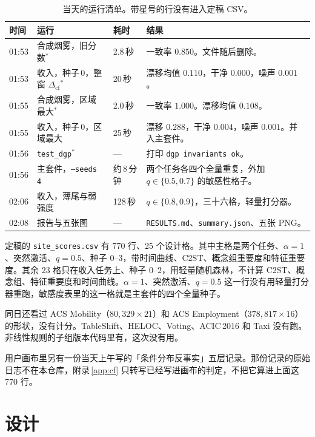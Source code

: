 \documentclass[11pt,a4paper,fontset=none]{ctexart}
\newcommand{\Dcf}{\ensuremath{\Delta_{\mathrm{cf}}}}
\begin{document}
\begin{table}[ht]
\centering
\caption{当天的运行清单。带星号的行没有进入定稿 CSV。}
\label{tab:runs}
\small
\begin{tabular}{@{}lll>{\raggedright\arraybackslash}p{6.5cm}@{}}
\toprule
时间 & 运行 & 耗时 & 结果 \\
\midrule
01:53 & 合成烟雾，旧分数\(^{*}\) & 2.8\,秒 & 一致率 \(0.850\)。文件随后删除。 \\
01:53 & 收入，种子\,0，整窗 \(\Dcf\)\(^{*}\) & 20\,秒 & 漂移均值 \(0.110\)，干净 \(0.000\)，噪声 \(0.001\)。 \\
01:55 & 合成烟雾，区域最大\(^{*}\) & 2.0\,秒 & 一致率 \(1.000\)。漂移均值 \(0.108\)。 \\
01:55 & 收入，种子\,0，区域最大 & 25\,秒 & 漂移 \(0.288\)，干净 \(0.004\)，噪声 \(0.001\)。并入主套件。 \\
01:56 & \texttt{test\_dgp}\(^{*}\) & --- & 打印 \texttt{dgp invariants ok}。 \\
01:56 & 主套件，\texttt{--seeds 4} & 约\,8\,分钟 & 两个任务各四个全量重复，外加 \(q\in\{0.5,0.7\}\) 的敏感性格子。 \\
02:06 & 收入，薄尾与弱强度 & 128\,秒 & \(q\in\{0.8,0.9\}\)，三十六格，轻量打分器。 \\
02:08 & 报告与五张图 & --- & \texttt{RESULTS.md}、\texttt{summary.json}、五张 PNG。 \\
\bottomrule
\end{tabular}
\end{table}

定稿的 \texttt{site\_scores.csv} 有 770 行、25 个设计格。其中主格是两个任务、\(\alpha=1\)、突然激活、\(q=0.5\)、种子 \(0\)--\(3\)，带时间曲线、C2ST、概念组重要度和特征重要度。其余 23 格只在收入任务上、种子 \(0\)--\(2\)，用轻量随机森林，不计算 C2ST、概念组、特征重要度和时间曲线。\(\alpha=1\)、突然激活、\(q=0.5\) 这一行没有用轻量打分器重跑，敏感度表里的这一格就是主套件的四个全量种子。

同日还看过 ACS Mobility（\(80{,}329\times 21\)）和 ACS Employment（\(378{,}817\times 16\)）的形状，没有计分。TableShift、HELOC、Voting、ACIC\,2016 和 Taxi 没有跑。非线性规则的子组版本代码里有，这次没有用。

用户画布里另有一份当天上午写的「条件分布反事实」五层记录。那份记录的原始日志不在本仓库，附录\,\ref{app:cf} 只转写已经写进画布的判定，不把它算进上面这 770 行。

\section{设计}
\label{sec:design}
\end{document}
